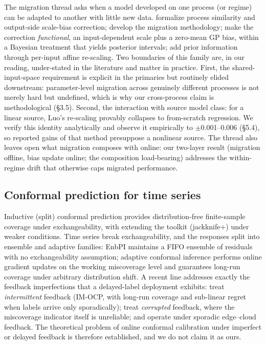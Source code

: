 The migration thread asks when a model developed on one process (or regime) can be
adapted to another with little new data. \citep{lu2008similarity,lu2008inclusive} formalize process
similarity and output-side scale-bias correction; \citep{lu2009} develop the
migration methodology; \citep{yan2011} make the correction \emph{functional}, an
input-dependent scale plus a zero-mean GP bias, within a Bayesian treatment that
yields posterior intervals; \citep{luo2015} add prior information through per-input
affine re-scaling. Two boundaries of this family are, in our reading, under-stated in
the literature and matter in practice. First, the shared-input-space requirement is
explicit in the primaries but routinely elided downstream: parameter-level migration
across genuinely different processes is not merely hard but undefined, which is why
our cross-process claim is methodological (\S 3.5). Second, the interaction with source
model class: for a linear source, Luo's re-scaling provably collapses to from-scratch
regression. We verify this identity analytically and observe it empirically to
$\pm$0.001--0.006 (\S 5.4), so reported gains of that method presuppose a nonlinear source.
The thread also leaves open what migration composes with online: our two-layer result
(migration offline, bias update online; the composition load-bearing) addresses the
within-regime drift that otherwise caps migrated performance.

\subsection{Conformal prediction for time series}

Inductive (split) conformal prediction \citep{papadopoulos2002} provides
distribution-free finite-sample coverage under exchangeability, with \citep{barber2021} extending the toolkit (jackknife+) under weaker conditions. Time series break
exchangeability, and the responses split into ensemble and adaptive families: EnbPI
\citep{xu2021enbpi} maintains a FIFO ensemble of residuals with no exchangeability
assumption; adaptive conformal inference \citep{gibbs2021aci} performs online
gradient updates on the working miscoverage level and guarantees long-run coverage
under arbitrary distribution shift. A recent line addresses exactly the feedback
imperfections that a delayed-label deployment exhibits: \citep{wang2025imocp}
treat \emph{intermittent} feedback (IM-OCP, with long-run coverage and sub-linear regret
when labels arrive only sporadically); \citep{wang2026corrupted} treat \emph{corrupted}
feedback, where the miscoverage indicator itself is unreliable; and \citep{hou2025ocppls}
operate under sporadic edge--cloud feedback. The theoretical problem of online conformal
calibration under imperfect or delayed feedback is therefore established, and we do not
claim it as ours.

